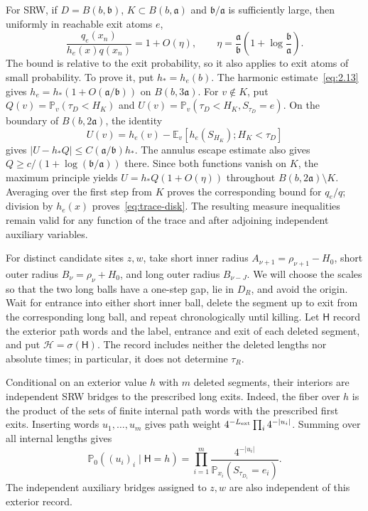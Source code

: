 \documentclass[11pt,a4paper]{article}
\numberwithin{equation}{section}
\theoremstyle{remark}
\begin{document}
For SRW, if $D=B(b,\mathfrak b)$, $K\subset B(b,\mathfrak a)$ and $\mathfrak b/\mathfrak a$ is sufficiently large, then uniformly in reachable exit atoms $e$,
\begin{equation}\label{eq:trace-disk}
 \frac{q_e(x_n)}{h_e(x)q(x_n)}=1+O(\eta),\qquad
 \eta=\frac{\mathfrak a}{\mathfrak b}\left(1+\log\frac{\mathfrak b}{\mathfrak a}\right).
\end{equation}
The bound is relative to the exit probability, so it also applies to exit atoms of small probability. To prove it, put $h_*=h_e(b)$. The harmonic estimate~\eqref{eq:2.13} gives $h_e=h_*(1+O(\mathfrak a/\mathfrak b))$ on $B(b,3\mathfrak a)$. For $v\notin K$, put $Q(v)=\mathbb P_v(\tau_D<H_K)$ and $U(v)=\mathbb P_v(\tau_D<H_K,S_{\tau_D}=e)$. On the boundary of $B(b,2\mathfrak a)$, the identity
\[
 U(v)=h_e(v)-\mathbb E_v[h_e(S_{H_K});H_K<\tau_D]
\]
gives $|U-h_*Q|\le C(\mathfrak a/\mathfrak b)h_*$. The annulus escape estimate also gives $Q\ge c/(1+\log(\mathfrak b/\mathfrak a))$ there. Since both functions vanish on $K$, the maximum principle yields $U=h_*Q(1+O(\eta))$ throughout $B(b,2\mathfrak a)\setminus K$. Averaging over the first step from $K$ proves the corresponding bound for $q_e/q$; division by $h_e(x)$ proves~\eqref{eq:trace-disk}. The resulting measure inequalities remain valid for any function of the trace and after adjoining independent auxiliary variables.

For distinct candidate sites $z,w$, take short inner radius $A_{\nu+1}=\rho_{\nu+1}-H_0$, short outer radius $B_\nu=\rho_\nu+H_0$, and long outer radius $B_{\nu-J}$. We will choose the scales so that the two long balls have a one-step gap, lie in $D_R$, and avoid the origin. Wait for entrance into either short inner ball, delete the segment up to exit from the corresponding long ball, and repeat chronologically until killing. Let $\mathsf H$ record the exterior path words and the label, entrance and exit of each deleted segment, and put $\mathscr H=\sigma(\mathsf H)$. The record includes neither the deleted lengths nor absolute times; in particular, it does not determine $\tau_R$.

Conditional on an exterior value $h$ with $m$ deleted segments, their interiors are independent SRW bridges to the prescribed long exits. Indeed, the fiber over $h$ is the product of the sets of finite internal path words with the prescribed first exits. Inserting words $u_1,\ldots,u_m$ gives path weight $4^{-L_{\rm ext}}\prod_i4^{-|u_i|}$. Summing over all internal lengths gives
\begin{equation}\label{eq:exterior-fiber}
 \mathbb P_0((u_i)_i\mid\mathsf H=h)
 =\prod_{i=1}^m\frac{4^{-|u_i|}}{\mathbb P_{x_i}(S_{\tau_{D_i}}=e_i)}.
\end{equation}
The independent auxiliary bridges assigned to $z,w$ are also independent of this exterior record.
\end{document}
